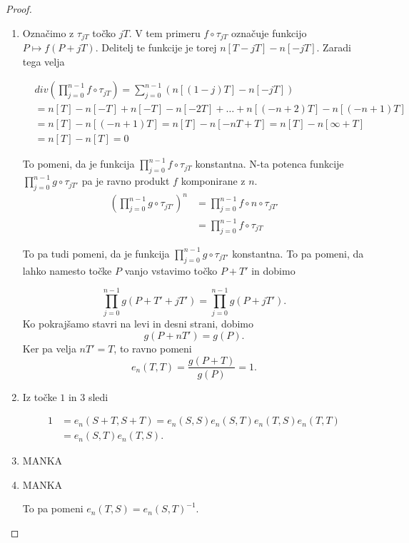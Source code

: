 \documentclass[12pt,a4paper,twoside]{article}
\theoremstyle{definition} %
\theoremstyle{plain} %
\numberwithin{equation}{section}  %
\begin{document}
\begin{proof}
\begin{enumerate}
\item Označimo z $\tau_{jT}$ točko $jT$. V tem primeru $f \circ \tau_{jT}$ označuje funkcijo \newline $P \mapsto f(P+jT)$. Delitelj te funkcije je torej $n[T-jT]-n[-jT]$. Zaradi tega velja

\begin{align}
&{}div(\prod_{j=0}^{n-1}f\circ \tau_{jT}) = \sum_{j=0}^{n-1}(n[(1-j)T]-n[-jT]) \nonumber \\
&{} = n[T] - n[-T] + n[-T] - n[-2T]+ \dots + n[(-n+2)T]-n[(-n+1)T]  \nonumber \\
&{} = n[T]-n[(-n+1)T] = n[T]-n[-nT+T] = n[T] - n[\infty +T] \nonumber \\
&{} = n[T]-n[T] = 0 \nonumber
\end{align}

To pomeni, da je funkcija $\prod_{j=0}^{n-1}f\circ \tau_{jT}$ konstantna. N-ta potenca funkcije $\prod_{j=0}^{n-1}g\circ \tau_{jT'}$ pa je ravno produkt $f$ komponirane z $n$. 
\begin{align}
(\prod_{j=0}^{n-1}g\circ \tau_{jT'})^n &{}= \prod_{j=0}^{n-1}f \circ n \circ \tau_{jT'} \nonumber \\
&{}= \prod_{j=0}^{n-1}f \circ \tau_{jT}  \nonumber %
\end{align}

To pa tudi pomeni, da je funkcija $\prod_{j=0}^{n-1}g\circ \tau_{jT'}$ konstantna.
To pa pomeni, da lahko namesto točke $P$ vanjo vstavimo točko $P+T'$ in dobimo

$$\prod_{j=0}^{n-1}g( P + T'+jT') = \prod_{j=0}^{n-1}g(P+jT') .$$
Ko pokrajšamo stavri na levi in desni strani, dobimo
$$g(P+nT') = g(P).$$
Ker pa velja $nT' = T$, to ravno pomeni
$$e_n(T,T) = \frac{g(P+T)}{g(P)} = 1.$$


\item Iz točke $1$ in $3$ sledi

\begin{align}
1 &{}= e_n(S+T,S+T) = e_n(S,S)e_n(S,T)e_n(T,S)e_n(T,T) \nonumber \\
 &{} = e_n(S,T)e_n(T,S). \nonumber
\end{align}

\item MANKA

\item MANKA

To pa pomeni $e_n(T,S) = e_n(S,T)^{-1}$.
\end{enumerate}

\end{proof}
\end{document}

